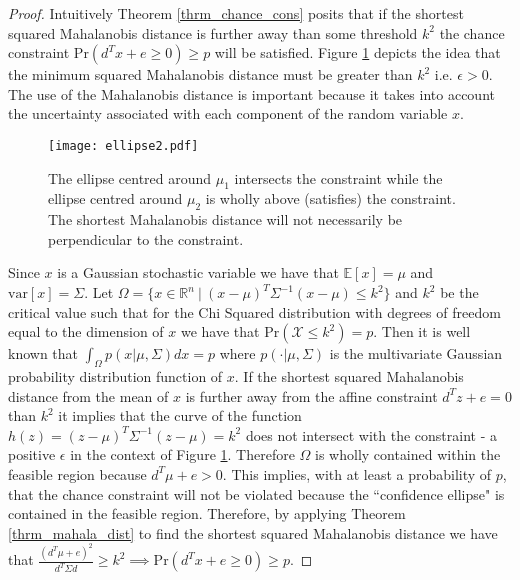 \begin{proof}
Intuitively Theorem \ref{thrm_chance_cons} posits that if the shortest squared Mahalanobis distance is further away than some threshold $k^2$ the chance constraint $\text{Pr}(d^Tx + e \geq 0) \geq p$ will be satisfied. Figure \ref{fig_mahala_ellipse} depicts the idea that the minimum squared Mahalanobis distance must be greater than $k^2$ i.e. $\epsilon > 0$. The use of the Mahalanobis distance is important because it takes into account the uncertainty associated with each component of the random variable $x$.  
\begin{figure}[H] 
\centering
\texttt{[image: ellipse2.pdf]}
\caption{The ellipse centred around $\mu_1$ intersects the constraint while the ellipse centred around $\mu_2$ is wholly above (satisfies) the constraint. The shortest Mahalanobis distance will not necessarily be perpendicular to the constraint.}
\label{fig_mahala_ellipse}
\end{figure}
Since $x$ is a Gaussian stochastic variable we have that $\mathbb{E}[x] =\mu$ and $\text{var}[x]=\Sigma$. Let $\Omega = \{x \in \mathbb{R}^n~|~(x-\mu)^T\Sigma^{-1}(x-\mu) \leq k^2\}$ and $k^2$ be the critical value such that for the Chi Squared distribution with degrees of freedom equal to the dimension of $x$ we have that $\text{Pr}(\mathcal{X} \leq k^2) = p$. Then it is well known \cite{mahala2} that $\int_{\Omega}p(x|\mu, \Sigma)dx = p$ where $p(\cdot|\mu, \Sigma)$ is the multivariate Gaussian probability distribution function of $x$. If the shortest squared Mahalanobis distance from the mean of $x$ is further away from the affine constraint $d^Tz+e=0$ than $k^2$ it implies that the curve of the function $h(z) = (z-\mu)^T\Sigma^{-1}(z-\mu) = k^2$ does not intersect with the constraint - a positive $\epsilon$ in the context of Figure \ref{fig_mahala_ellipse}. Therefore $\Omega$ is wholly contained within the feasible region because $d^T\mu+e> 0 $. This implies, with at least a probability of $p$, that the chance constraint will not be violated because the ``confidence ellipse" is contained in the feasible region. Therefore, by applying Theorem \ref{thrm_mahala_dist} to find the shortest squared Mahalanobis distance we have that $\frac{(d^T\mu+e)^2}{d^T \Sigma d} \geq k^2 \implies \text{Pr}(d^Tx + e \geq 0) \geq p$.


\end{proof}

